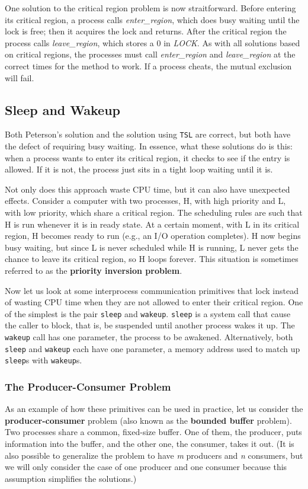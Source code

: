 \documentclass{book}
\newcommand {\kw}  [1] {\textbf{#1}}
\newcommand {\sys} [1] {\textsl{#1}}
\newcommand {\cmd} [1] {\texttt{#1}}
\begin{document}
One solution to the critical region problem is now straitforward.
Before entering its critical region, a process calls \sys{enter\_region}, which does busy waiting until the lock is free;
then it acquires the lock and returns.
After the critical region the process calls \sys{leave\_region}, which stores a 0 in \sys{LOCK}.
As with all solutions based on critical regions, the processes must call \sys{enter\_region} and \sys{leave\_region} 
at the correct times for the method to work.
If a process cheats, the mutual exclusion will fail.

\subsection{Sleep and Wakeup}
Both Peterson's solution and the solution using \cmd{TSL} are correct, but both have the defect of requiring busy waiting.
In essence, what these solutions do is this: when a process wants to enter its critical region, 
it checks to see if the entry is allowed.
If it is not, the process just sits in a tight loop waiting until it is.

Not only does this approach waste CPU time, but it can also have unexpected effects.
Consider a computer with two processes, H, with high priority and L, with low priority, which share a critical region.
The scheduling rules are such that H is run whenever it is in ready state.
At a certain moment, with L in its critical region, H becomes ready to run (e.g., an I/O operation completes).
H now begins busy waiting, but since L is never scheduled while H is running, 
L never gets the chance to leave its critical region, so H loops forever.
This situation is sometimes referred to as the \kw{priority inversion problem}.

Now let us look at some interprocess communication primitives that lock instead of wasting CPU time 
when they are not allowed to enter their critical region.
One of the simplest is the pair \cmd{sleep} and \cmd{wakeup}.
\cmd{sleep} is a system call that cause the caller to block, that is, be suspended until another process wakes it up.
The \cmd{wakeup} call has one parameter, the process to be awakened.
Alternatively, both \cmd{sleep} and \cmd{wakeup} each have one parameter, 
a memory address used to match up \cmd{sleep}s with \cmd{wakeup}s.

\subsubsection*{The Producer-Consumer Problem}
As an example of how these primitives can be used in practice,
let us consider the \kw{producer-consumer} problem (also known as the \kw{bounded buffer} problem).
Two processes share a common, fixed-size buffer.
One of them, the producer, puts information into the buffer, and the other one, the consumer, takes it out.
(It is also possible to generalize the problem to have \sys{m} producers and \sys{n} consumers, 
but we will only consider the case of one producer and one consumer because this assumption simplifies the solutions.)
\end{document}
